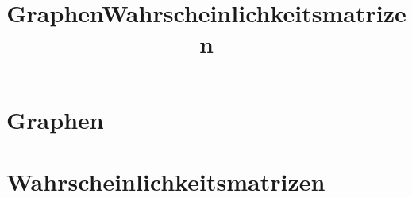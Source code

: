 %

\title[Graphen]{Graphen}
\section{Graphen}
\titel


\title[Wahrscheinlichkeit]{Wahrscheinlichkeitsmatrizen}
\section{Wahrscheinlichkeitsmatrizen}
\titel


%

%

